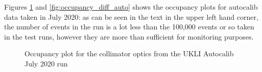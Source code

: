 Figures \ref{fig:occupancy_coll_auto} and \ref{fig:occupancy_diff_auto} shows the occupancy plots for autocalib data taken in July 2020: as can be seen in the text in the upper left hand corner, the number of events in the run is a lot less than the 100,000 events or so taken in the test runs, however they are more than sufficient for monitoring purposes.

\begin{figure}[!htbp]
    \centering
    
    \caption{Occupancy plot for the collimator optics from the UKLI Autocalib July 2020 run} \label{fig:occupancy_coll_auto} 
    
     \hfill
     \par
     \hfill

\end{figure}
